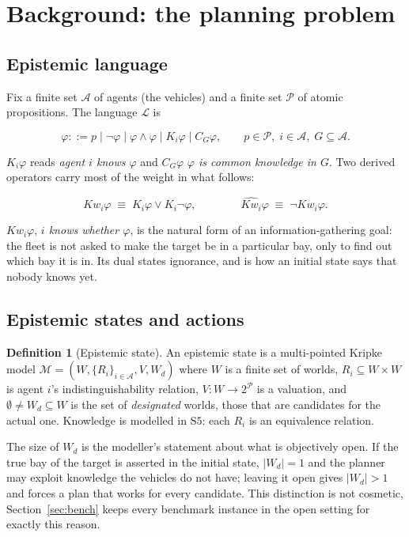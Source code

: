 \documentclass[11pt,a4paper]{article}
\theoremstyle{definition}
\newtheorem{definition}{Definition}
\newcommand{\Ag}{\mathcal{A}}
\newcommand{\Prop}{\mathcal{P}}
\newcommand{\Kop}[1]{K_{#1}}
\newcommand{\Kw}[1]{\mathit{Kw}_{#1}}
\newcommand{\Cop}[1]{C_{#1}}
\newcommand{\Mod}{\mathcal{M}}
\begin{document}
\section{Background: the planning problem}

\subsection{Epistemic language}

Fix a finite set $\Ag$ of agents (the vehicles) and a finite set $\Prop$ of
atomic propositions. The language $\mathcal{L}$ is

\[
\varphi ::= p \mid \neg\varphi \mid \varphi\wedge\varphi \mid \Kop{i}\varphi
      \mid \Cop{G}\varphi , \qquad p\in\Prop,\; i\in\Ag,\; G\subseteq\Ag .
\]

$\Kop{i}\varphi$ reads \emph{agent $i$ knows $\varphi$} and $\Cop{G}\varphi$
\emph{$\varphi$ is common knowledge in $G$}. Two derived operators carry most
of the weight in what follows:

\[
\Kw{i}\varphi \;\equiv\; \Kop{i}\varphi \vee \Kop{i}\neg\varphi ,
\qquad\qquad
\widehat{\Kw{i}}\varphi \;\equiv\; \neg\Kw{i}\varphi .
\]

$\Kw{i}\varphi$, \emph{$i$ knows whether $\varphi$}, is the natural form
of an information-gathering goal: the fleet is not asked to make the target be
in a particular bay, only to find out which bay it is in. Its dual states
ignorance, and is how an initial state says that nobody knows yet.

\subsection{Epistemic states and actions}

\begin{definition}[Epistemic state]
An epistemic state is a multi-pointed Kripke model
$\Mod = (W, \{R_i\}_{i\in\Ag}, V, W_d)$ where $W$ is a finite set of worlds,
$R_i\subseteq W\times W$ is agent $i$'s indistinguishability relation, $V:W\to
2^{\Prop}$ is a valuation, and $\emptyset\neq W_d\subseteq W$ is the set of
\emph{designated} worlds, those that are candidates for the actual one.
Knowledge is modelled in $\mathrm{S5}$: each $R_i$ is an equivalence relation.
\end{definition}

The size of $W_d$ is the modeller's statement about what is objectively open.
If the true bay of the target is asserted in the initial state, $|W_d| = 1$ and
the planner may exploit knowledge the vehicles do not have; leaving it open
gives $|W_d| > 1$ and forces a plan that works for every candidate. This
distinction is not cosmetic, Section~\ref{sec:bench} keeps every benchmark
instance in the open setting for exactly this reason.
\end{document}
